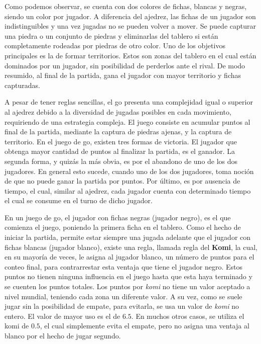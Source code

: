 \documentclass[11pt,twoside, spanish]{report} %
\begin{document}
Como podemos observar, se cuenta con dos colores de fichas, blancas y negras, siendo un color por jugador.
A diferencia del ajedrez, las fichas de un jugador son indistinguibles y una vez jugadas no se pueden volver a mover.
Se puede capturar una piedra o un conjunto de piedras y eliminarlas del tablero si est\'an completamente rodeadas por piedras de otro color.
Uno de los objetivos principales es la de formar territorios.
Estos son zonas del tablero en el cual est\'an dominados por un jugador, sin posibilidad de perderlos ante el rival.
De modo resumido, al final de la partida, gana el jugador con mayor territorio y fichas capturadas.



A pesar de tener reglas sencillas, el go presenta una complejidad igual o superior al ajedrez debido a la diversidad de jugadas posibles en cada movimiento, requiriendo de una estrategia compleja. %
El juego consiste en acumular puntos al final de la partida, mediante la captura de piedras ajenas, y la captura de territorio.
En el juego de go, existen tres formas de victoria.
El jugador que obtenga mayor cantidad de puntos al finalizar la partida, es el ganador.
La segunda forma, y quiz\'as la m\'as obvia, es por el abandono de uno de los dos jugadores.
En general esto sucede, cuando uno de los dos jugadores, toma noci\'on de que no puede ganar la partida por puntos.
Por \'ultimo, es por ausencia de tiempo, el cual, similar al ajedrez, cada jugador cuenta con determinado tiempo el cual se consume en el turno de dicho jugador.

En un juego de go, el jugador con fichas negras (jugador negro), es el que comienza el juego, poniendo la primera ficha en el tablero.
Como el hecho de iniciar la partida, permite estar siempre una jugada adelante que el jugador con fichas blancas (jugador blanco), existe una regla, llamada regla del \textbf{Komi}, la cual, en su mayor\'ia de veces, le asigna al jugador blanco, un n\'umero de puntos para el conteo final, para contrarrestar esta ventaja que tiene el jugador negro.
Estos puntos no tienen ninguna influencia en el juego hasta que esta haya terminado y se cuenten los puntos totales.
Los puntos por \emph{komi} no tiene un valor aceptado a nivel mundial, teniendo cada zona un diferente valor.
A su vez, como se suele jugar sin la posibilidad de empate, para evitarla, se usa un valor de \emph{komi} no entero.
El valor de mayor uso es el de $6.5$.
En muchos otros casos, se utiliza el komi de $0.5$, el cual simplemente evita el empate, pero no asigna una ventaja al blanco por el hecho de jugar segundo.
\end{document}
